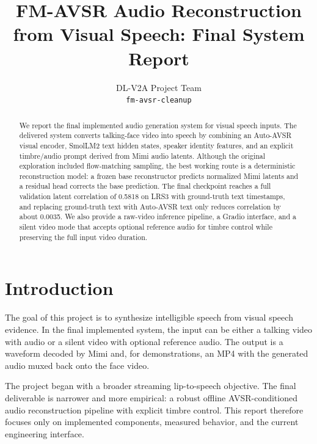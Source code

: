 \documentclass{article}
\title{FM-AVSR Audio Reconstruction from Visual Speech: Final System Report}
\author{%
  DL-V2A Project Team \\
  \texttt{fm-avsr-cleanup} \\
}
\begin{document}
\maketitle

\begin{abstract}
We report the final implemented audio generation system for visual speech
inputs. The delivered system converts talking-face video into speech by
combining an Auto-AVSR visual encoder, SmolLM2 text hidden states, speaker
identity features, and an explicit timbre/audio prompt derived from Mimi audio
latents. Although the original exploration included flow-matching sampling, the
best working route is a deterministic reconstruction model: a frozen base
reconstructor predicts normalized Mimi latents and a residual head corrects the
base prediction. The final checkpoint reaches a full validation latent
correlation of 0.5818 on LRS3 with ground-truth text timestamps, and replacing
ground-truth text with Auto-AVSR text only reduces correlation by about 0.0035.
We also provide a raw-video inference pipeline, a Gradio interface, and a silent
video mode that accepts optional reference audio for timbre control while
preserving the full input video duration.
\end{abstract}

\section{Introduction}

The goal of this project is to synthesize intelligible speech from visual speech
evidence. In the final implemented system, the input can be either a talking
video with audio or a silent video with optional reference audio. The output is a
waveform decoded by Mimi and, for demonstrations, an MP4 with the generated
audio muxed back onto the face video.

The project began with a broader streaming lip-to-speech objective. The final
deliverable is narrower and more empirical: a robust offline AVSR-conditioned
audio reconstruction pipeline with explicit timbre control. This report
therefore focuses only on implemented components, measured behavior, and the
current engineering interface.
\end{document}

